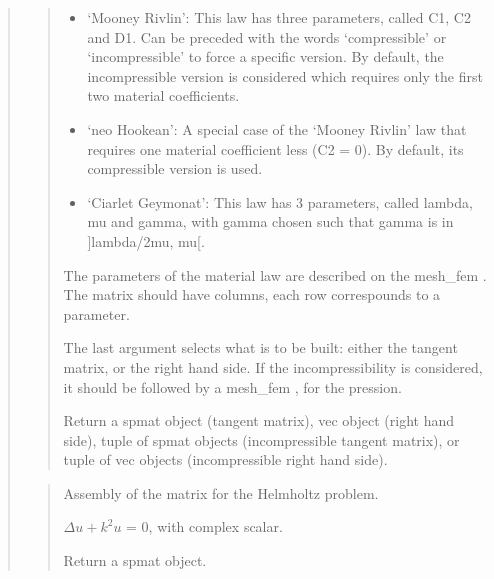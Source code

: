 \documentclass[a4paper,11pt,english]{sphinxmanual}
\begin{document}
\begin{quote}
\begin{quote}
\begin{itemize}
\item {} 
\sphinxAtStartPar
‘Mooney Rivlin’:
This law has three parameters, called C1, C2 and D1.
Can be preceded with the words ‘compressible’ or ‘incompressible’ to force
a specific version. By default, the incompressible version is considered
which requires only the first two material coefficients.

\item {} 
\sphinxAtStartPar
‘neo Hookean’:
A special case of the ‘Mooney Rivlin’ law that requires one material
coefficient less (C2 = 0). By default, its compressible version is used.

\item {} 
\sphinxAtStartPar
‘Ciarlet Geymonat’:
This law has 3 parameters, called lambda, mu and gamma, with
gamma chosen such that gamma is in {]}\sphinxhyphen{}lambda/2\sphinxhyphen{}mu, \sphinxhyphen{}mu{[}.

\end{itemize}

\sphinxAtStartPar
The parameters of the material law are described on the mesh\_fem .
The matrix  should have  columns, each row
correspounds to a parameter.

\sphinxAtStartPar
The last argument selects what is to be built: either the tangent
matrix, or the right hand side. If the incompressibility is
considered, it should be followed by a mesh\_fem , for the
pression.

\sphinxAtStartPar
Return a spmat object (tangent matrix), vec object (right hand
side), tuple of spmat objects (incompressible tangent matrix), or
tuple of vec objects (incompressible right hand side).
\end{quote}

\sphinxAtStartPar
{}
\begin{quote}

\sphinxAtStartPar
Assembly of the matrix for the Helmholtz problem.

\sphinxAtStartPar
\(\Delta u + k^2 u\) = 0,  with  complex scalar.

\sphinxAtStartPar
Return a spmat object.
\end{quote}

\sphinxAtStartPar
{}
\begin{quote}


\end{quote}
\end{quote}
\end{document}
